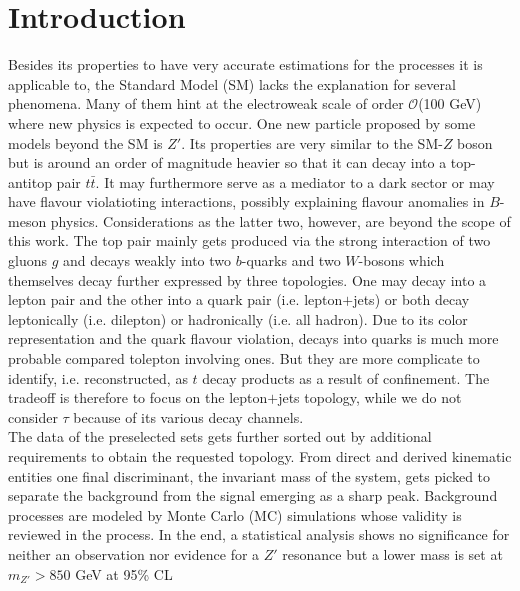 
\section{Introduction}
Besides its properties to have very accurate estimations for the processes it is applicable to, the Standard Model (SM) lacks the explanation for 
several phenomena. Many of them hint at the electroweak scale of order $\mathcal{O}$(100 GeV) where new physics is expected to occur. One new particle
proposed by some models beyond the SM is $Z'$. Its properties are very similar to the SM-$Z$ boson but is around an order of magnitude heavier so that
it can decay into a top-antitop pair $t\bar t$. It may furthermore serve as a mediator to a dark sector or may have flavour violatioting interactions, 
possibly 
explaining flavour anomalies in $B$-meson physics. Considerations as the latter two, however, are beyond the scope of this work. The top pair mainly
gets produced via the strong interaction of two gluons $g$ and decays weakly into two $b$-quarks and two $W$-bosons which themselves decay further 
expressed by three topologies. One may decay into a lepton pair and the other into a quark pair (i.e. lepton$+$jets) or both decay leptonically 
(i.e. dilepton) or hadronically (i.e. all hadron). Due to its color representation and the quark flavour violation, decays into quarks is much more 
probable compared tolepton involving ones. But they are more complicate to identify, i.e. reconstructed, as $t$ decay products as a result of 
confinement. The tradeoff is therefore to focus on the lepton$+$jets topology, while we do not consider $\tau$ because of its various decay channels.
\\
\noindent The data \cite{Atlas} of the preselected sets gets further sorted out by additional requirements to obtain the requested topology. From direct and 
derived kinematic entities one final discriminant, the invariant mass of the system, gets picked to separate the background from the signal emerging
as a sharp peak. Background processes are modeled by Monte Carlo (MC) simulations whose validity is reviewed in the process. In the end, a statistical
analysis shows no significance for neither an observation nor evidence for a $Z'$ resonance but a lower mass is set at $m_{Z'} >850$ GeV at 
95\% CL


\FloatBarrier
